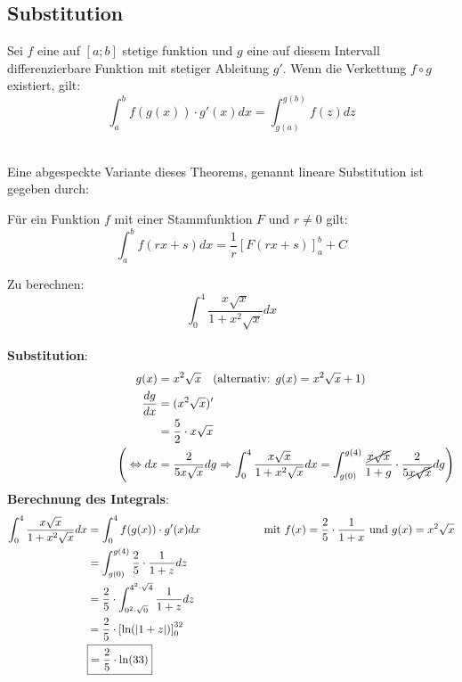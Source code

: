 \subsection{Substitution}
\begin{Theorem}
  Sei $f$ eine auf $[a;b]$ stetige funktion und $g$ eine auf diesem Intervall differenzierbare Funktion mit stetiger Ableitung
  $g'$. Wenn die Verkettung $f \circ g$ existiert, gilt:
  $$\int_a^b f(g(x))\cdot g'(x)dx=\int_{g(a)}^{g(b)}f(z)dz$$
\end{Theorem}\\
Eine abgespeckte Variante dieses Theorems, genannt lineare Substitution ist gegeben durch:
\begin{Theorem}
  Für ein Funktion $f$ mit einer Stammfunktion $F$ und $r\neq 0$ gilt:
  $$\int_a^b f(rx+s)dx=\dfrac{1}{r}[F(rx+s)]_a^b + C$$
\end{Theorem}
\begin{Beispiel}
    Zu berechnen: $$\int_0^4 \dfrac{x\sqrt{x}}{1 + x^2\sqrt{x}} dx$$ \\
    \textbf{Substitution}:
    \begin{align*}
        \quad \qquad \qquad \qquad \qquad \qquad
        g(x) &= x^2\sqrt{x} \quad (\text{alternativ: } g(x) = x^2\sqrt{x} + 1) \\
        \dfrac{dg}{dx} &= (x^2\sqrt{x})' \\
                          &= \dfrac{5}{2} \cdot x\sqrt{x} \\
        \Bigg(\Leftrightarrow dx &= \dfrac{2}{5x\sqrt{x}}dg \Rightarrow \int_0^4 \dfrac{x\sqrt{x}}{1 + x^2\sqrt{x}} dx = \int_{g(0)}^{g(4)} \dfrac{\cancel{x\sqrt{x}}}{1 + g} \cdot \dfrac{2}{5\cancel{x\sqrt{x}}}dg\Bigg)
    \end{align*}
    \textbf{Berechnung des Integrals}:
    \begin{align*}
        \int_0^4 \dfrac{x\sqrt{x}}{1 + x^2\sqrt{x}} dx &= \int_0^4 f(g(x))\cdot g'(x)dx \text{\hspace{2cm}mit $f(x)=\dfrac{2}{5} \cdot \dfrac{1}{1+x}$ und $g(x) = x^2\sqrt{x}$}\\
        &= \int_{g(0)}^{g(4)} \dfrac{2}{5} \cdot\dfrac{1}{1 + z}dz \\
        &= \dfrac{2}{5} \cdot \int_{0^2\cdot\sqrt{0}}^{4^2\cdot\sqrt{4}} \dfrac{1}{1 + z}dz \\
        &= \dfrac{2}{5} \cdot \left[\ln(|1 + z|)\right]_0^{32} \\
        &\boxed{= \dfrac{2}{5} \cdot \ln(33)}
    \end{align*}
\end{Beispiel}

